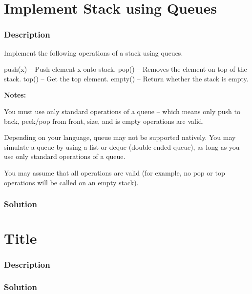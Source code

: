 \newpage

\section{Implement Stack using Queues} %

\subsubsection{Description}
Implement the following operations of a stack using queues.
\begin{Code}
push(x) -- Push element x onto stack.
pop() -- Removes the element on top of the stack.
top() -- Get the top element.
empty() -- Return whether the stack is empty.
\end{Code}

\textbf{Notes:}

You must use only standard operations of a queue -- which means only push to back, peek/pop from front, size, and is empty operations are valid.

Depending on your language, queue may not be supported natively. You may simulate a queue by using a list or deque (double-ended queue), as long as you use only standard operations of a queue.

You may assume that all operations are valid (for example, no pop or top operations will be called on an empty stack).

\subsubsection{Solution}

\begin{Code}

\end{Code}

\newpage

\section{Title} %

\subsubsection{Description}

\subsubsection{Solution}

\begin{Code}

\end{Code}

\newpage

